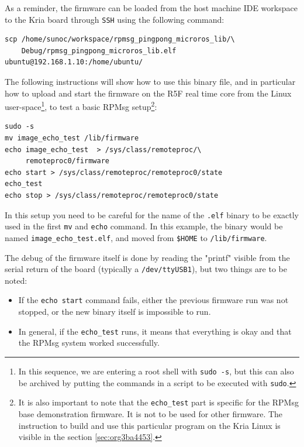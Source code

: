 \documentclass[10pt]{article}
\begin{document}
As a reminder, the firmware can be loaded from the host machine IDE workspace
to the Kria board through \texttt{SSH} using the following command:
\begin{verbatim}
scp /home/sunoc/workspace/rpmsg_pingpong_microros_lib/\
    Debug/rpmsg_pingpong_microros_lib.elf  ubuntu@192.168.1.10:/home/ubuntu/
\end{verbatim}

The following instructions will show how to use this binary file, and
in particular how to upload and start the firmware on the R5F real time core
from the Linux user-space\footnote{In this sequence, we are entering a root shell with \texttt{sudo -s}, but this can
also be archived by putting the commands in a script to be executed with \texttt{sudo}.}, to test a basic RPMsg setup\footnote{It is also important to note that the \texttt{echo\_test} part is specific for the
RPMsg base demonstration firmware. It is not to be used for other firmware.
The instruction to build and use this particular program on the Kria Linux
is visible in the section \ref{sec:org3ba4453}.}:
\begin{verbatim}
sudo -s
mv image_echo_test /lib/firmware
echo image_echo_test  > /sys/class/remoteproc/\
     remoteproc0/firmware
echo start > /sys/class/remoteproc/remoteproc0/state
echo_test
echo stop > /sys/class/remoteproc/remoteproc0/state
\end{verbatim}

In this setup you need to be careful for the name of the \texttt{.elf} binary to be exactly used
in the first \texttt{mv} and \texttt{echo} command. In this example, the binary would be named
\texttt{image\_echo\_test.elf}, and moved from \texttt{\$HOME} to \texttt{/lib/firmware}.

The debug of the firmware itself is done by reading the "printf" visible from the serial
return of the board (typically a \texttt{/dev/ttyUSB1}), but two things are to be noted:
\begin{itemize}
\item If the \texttt{echo start} command fails, either the previous firmware run was not stopped,
or the new binary itself is impossible to run.
\item In general, if the \texttt{echo\_test} runs, it means that everything is okay and that
the RPMsg system worked successfully.
\end{itemize}
\pagebreak
\end{document}
